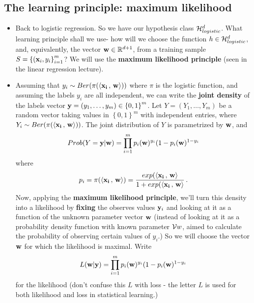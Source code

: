   \subsection{The learning principle: maximum likelihood}
  \begin{itemize}
    \item Back to logistic regression. So we have our hypothesis class 
      $\mathcal{H}_{logistic}^d$. What learning principle shall we use- how will we
      choose the function $h\in \mathcal{H}_{logistic}^d$, and, equivalently, the vector 
      $\mathbf{w}\in\mathbb{R}^{d+1}$, from a training sample 
      $S=\left\{ (\mathbf{x}_i,y_i \right\}_{i=1}^m$?
      We will use the {\bf maximum likelihood principle} (seen in the
      linear regression lecture).
    \item Assuming that $y_i \sim Ber(\pi
      ({\left\langle \mathbf{x_i}\,,\,\mathbf{w} \right\rangle} ))$ where $\pi$ is the logistic function, and
      assuming the labels $y_i$ are all independent, we can write the {\bf joint
      density} of the labels vector $\mathbf{y}=(y_1,\ldots,y_m)\in\left\{ 0,1
      \right\}^m$. Let $Y=(Y_1,\ldots,Y_m)$ be a random vector taking values in
      $\left\{ 0,1 \right\}^m$ with independent entries, where
      $Y_i \sim Ber(\pi
      ({\left\langle \mathbf{x_i}\,,\,\mathbf{w} \right\rangle} ))$. The joint distribution of $Y$ is parametrized
      by $\mathbf{w}$, and 
      \[
	Prob(Y=\mathbf{y} | \mathbf{w}) = \prod_{i=1}^m p_i(\mathbf{w})^{y_i} (1-p_i(\mathbf{w})^{1-y_i}
      \]
      where 
      \[p_i = \pi
      ({\left\langle \mathbf{x_i}\,,\,\mathbf{w} \right\rangle} ) = 
      \frac{exp({\left\langle \mathbf{x_i}\,,\,\mathbf{w} \right\rangle}}{1+exp({\left\langle \mathbf{x_i}\,,\,\mathbf{w} \right\rangle}}\,.
    \]
      Now, applying the {\bf maximum likelihood principle}, we'll turn this
      density into a likelihood by {\bf fixing} the observes values ${\mathbf y}_i$ and
      looking at it as a function of the unknown parameter vector $\mathbf{w}$
      (instead of looking at it as a probability density function with known
	parameter $\mathcal{V}{w}$, aimed to calculate the probability of observing
      certain values of $y_i$.)
      So we will choose the vector $\mathbf{w}$ for which the likelihood is maximal.
      Write
      \[
	L(\mathbf{w} | \mathbf{y}) = \prod_{i=1}^m p_i(\mathbf{w})^{y_i} (1-p_i(\mathbf{w})^{1-y_i}
      \]
      for the likelihood (don't confuse this $L$ with loss - the letter $L$ is used for both
      likelihood and loss in statistical learning.)

\end{itemize}
